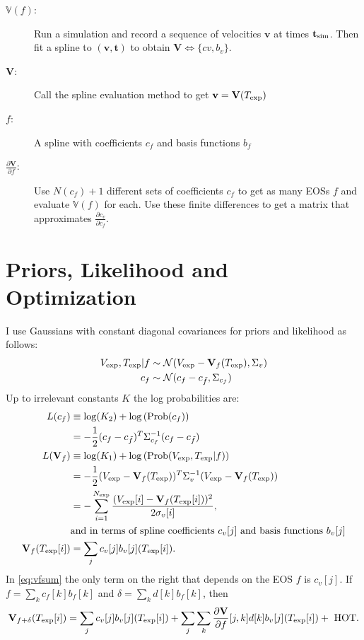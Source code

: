 \documentclass[]{article}
\newcommand{\normal}[2]{{\cal N}(#1,#2)}
\newcommand{\normalexp}[3]{ -\frac{1}{2}
      (#1 - #2)^T #3^{-1} (#1 - #2) }
\newcommand{\fnom}{\tilde f}
\newcommand{\Prob}{\text{Prob}}
\newcommand{\partiald}[2]{\frac{\partial #1}{\partial #2}}
\newcommand\bv{\mathbf{v}}
\newcommand\bt{\mathbf{t}}
\newcommand\Vfunc{\mathbb{V}}
\newcommand\Vt{\mathbf{V}}
\newcommand\vexp{V_{\rm{exp}}}
\newcommand\texp{T_{\rm{exp}}}
\newcommand\cf{c_f}
\newcommand\cv{c_v}
\newcommand\fbasis{b_f}
\newcommand\vbasis{b_v}
\newcommand\tsim{{\mathbf t}_{\rm{sim}}}
\newcommand\DVDf{\partiald{\Vt}{f}}
\begin{document}
\begin{description}
\item[$\Vfunc(f)$:] Run a simulation and record a sequence of
  velocities $\bv$ at times $\tsim$.  Then fit a
  spline to $(\bv, \bt)$ to obtain $\Vt\iff \{cv,\vbasis\}$.
\item[$\Vt$:] Call the spline evaluation method to get $\bv = \Vt(\texp)$
\item[$f$:] A spline with coefficients $\cf$ and basis functions
  $\fbasis$
\item[$\DVDf$:] Use $N(\cf)+1$ different sets of coefficients $\cf$ to
  get as many EOSs $f$ and evaluate $\Vfunc(f)$ for each.  Use these
  finite differences to get a matrix that approximates
  $\partiald{\cv}{\cf}$.
\end{description}

\section{Priors, Likelihood and Optimization}
\label{sec:opt}

I use Gaussians with constant diagonal covariances for priors and
likelihood as follows:
\begin{align}
\vexp,\texp | f &\sim \normal{\vexp-\Vt_f(\texp)}{\Sigma_v} \\
\cf &\sim \normal{\cf - c_{\fnom}}{\Sigma_{\cf}}
\end{align}
Up to irrelevant constants $K$ the log probabilities are:
\begin{align}
  L(\cf) & \equiv \log(K_2) + \log \left(\Prob(\cf) \right)\\
  & = \normalexp{\cf}{c_{\fnom}}{\Sigma_{\cf}}\\
  L(\Vt_f) & \equiv \log(K_1) + \log \left(\Prob(\vexp,\texp | f) \right)
  \nonumber \\
  & = \normalexp{\vexp}{\Vt_f(\texp)}{\Sigma_v} \\
  &= -\sum_{i=1}^{N_{\rm exp}} \frac{(\vexp[i] -
    \Vt_f(\texp[i]))^2}{2\sigma_v[i]}, \\
  & \text{and in terms of spline coefficients }\cv[j]\text{ and basis
    functions } \vbasis[j]\\
  \label{eq:vfsum}
  \Vt_f(\texp[i]) &= \sum_j \cv[j]\vbasis[j](\texp[i]).
\end{align}
In \eqref{eq:vfsum} the only term on the right that depends on the EOS
$f$ is $\cv[j]$.  If $f=\sum_k \cf[k] \fbasis[k]$ and $\delta=\sum_k d[k]
\fbasis[k]$, then
\begin{equation}
  \label{eq:taylor}
  \Vt_{f+\delta}(\texp[i]) = \sum_j \cv[j]\vbasis[j](\texp[i]) +
  \sum_j \sum_k \DVDf[j,k]d[k]\vbasis[j](\texp[i]) +\text{ HOT}.
\end{equation}
\end{document}

